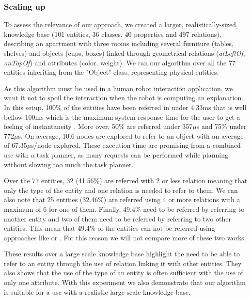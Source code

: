 \documentclass[a4paper,11pt,twoside]{StyleThese}
\begin{document}
\subsubsection{Scaling up}

To assess the relevance of our approach, we created a larger, realistically-sized, knowledge base (101 entities, 36 classes, 40 properties and 497 relations), describing an apartment with three rooms including several furniture (tables, shelves) and objects (cups, boxes) linked through geometrical relations (\textit{atLeftOf}, \textit{onTopOf}) and attributes (color, weight).
We ran our algorithm over all the 77 entities inheriting from the "Object" class, representing physical entities. 

\newcommand{\us}{$\mu$s\xspace}

As this algorithm must be used in a human robot interaction application, we want it not to spoil the interaction when the robot is computing an explanation. In this setup, 100\% of the entities have been referred in under 4.33ms that is well bellow 100ms which is the maximum system response time for the user to get a feeling of instantaneity \cite{miller1968response}. More over, 50\% are referred under 357\us and 75\% under 772\us. On average, 10.6 nodes are explored to refer to an object with an average of 67.35\us/node explored. These execution time are promising from a combined use with a task planner, as many requests can be performed while planning without slowing too much the task planner.

Over the 77 entities, 32 (41.56\%) are referred with 2 or less relation meaning that only the type of the entity and one relation is needed to refer to them. We can also note that 25 entities (32.46\%) are referred using 4 or more relations with a maximum of 6 for one of them. Finally, 49.4\% need to be referred by referring to another entity and two of them need to be referred by referring to two other entities. This mean that 49.4\% of the entities can not be referred using approaches like \cite{ros2010one} or \cite{dale1995computational}. For this reason we will not compare more of these two works.

These results over a large scale knowledge base highlight the need to be able to refer to an entity through the use of relation linking it with other entities. They also shows that the use of the type of an entity is often sufficient with the use of only one attribute. With this experiment we also demonstrate that our algorithm is suitable for a use with a realistic large scale knowledge base.
\end{document}
